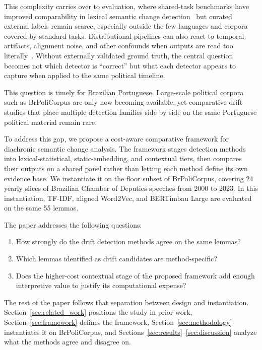 \documentclass[12pt]{article}
\begin{document}
This complexity carries over to evaluation, where shared-task benchmarks have
improved comparability in lexical semantic change
detection~\cite{schlechtweg-etal-2020-semeval} but curated external labels
remain scarce, especially outside the few languages and corpora covered by
standard tasks. Distributional pipelines can also react to temporal artifacts,
alignment noise, and other confounds when outputs are read too
literally~\cite{dubossarsky-etal-2019-timeout}. Without externally validated
ground truth, the central question becomes not which detector is ``correct''
but what each detector appears to capture when applied to the same political
timeline.

This question is timely for Brazilian Portuguese. Large-scale political corpora
such as BrPoliCorpus \cite{lima-lopes-2025-brpolicorpus} are only now becoming
available, yet comparative drift studies that place multiple detection families
side by side on the same Portuguese political material remain rare.

To address this gap, we propose a cost-aware comparative framework for diachronic semantic change analysis. The framework stages detection methods into lexical-statistical, static-embedding, and contextual tiers, then compares their outputs on a shared panel rather than letting each method define its own evidence base. We instantiate it on the floor subset of BrPoliCorpus, covering 24 yearly slices of Brazilian Chamber of Deputies speeches from 2000 to 2023. In this instantiation, TF-IDF, aligned Word2Vec, and BERTimbau Large are evaluated on the same 55 lemmas.

The paper addresses the following questions: 

\begin{enumerate}
    \item How strongly do the drift detection methods agree on the same lemmas? 

    \item Which lemmas identified as drift candidates are method-specific?

    \item Does the higher-cost contextual stage of the proposed framework add enough interpretive value to justify its computational expense?
\end{enumerate}

The rest of the paper follows that separation between design and instantiation. Section~\ref{sec:related_work} positions the study in prior work, Section~\ref{sec:framework} defines the framework, Section~\ref{sec:methodology} instantiates it on BrPoliCorpus, and Sections~\ref{sec:results}--\ref{sec:discussion} analyze what the methods agree and disagree on.
\end{document}
